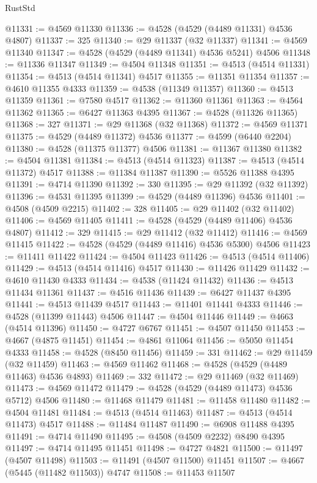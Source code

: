 \begin{lexlean}{RustStd}
\begin{coremodule}
@11331 := @4569 @11330
@11336 := @4528 (@4529 (@4489 @11331) @4536 @4807)
@11337 := 325
@11340 := @29 @11337 (@32 @11337)
@11341 := @4569 @11340
@11347 := @4528 (@4529 (@4489 @11341) @4536 @5241) @4506
@11348 := @11336 @11347
@11349 := @4504 @11348
@11351 := @4513 (@4514 @11331)
@11354 := @4513 (@4514 @11341) @4517
@11355 := @11351 @11354
@11357 := @4610 @11355 @4333
@11359 := @4538 (@11349 @11357)
@11360 := @4513 @11359
@11361 := @7580 @4517
@11362 := @11360 @11361
@11363 := @4564 @11362
@11365 := @6427 @11363 @4395
@11367 := @4528 (@11326 @11365)
@11368 := 327
@11371 := @29 @11368 (@32 @11368)
@11372 := @4569 @11371
@11375 := @4529 (@4489 @11372) @4536
@11377 := @4599 (@6440 @2204)
@11380 := @4528 (@11375 @11377) @4506
@11381 := @11367 @11380
@11382 := @4504 @11381
@11384 := @4513 (@4514 @11323)
@11387 := @4513 (@4514 @11372) @4517
@11388 := @11384 @11387
@11390 := @5526 @11388 @4395
@11391 := @4714 @11390
@11392 := 330
@11395 := @29 @11392 (@32 @11392)
@11396 := @4531 @11395
@11399 := @4529 (@4489 @11396) @4536
@11401 := @4508 (@4509 @2215)
@11402 := 328
@11405 := @29 @11402 (@32 @11402)
@11406 := @4569 @11405
@11411 := @4528 (@4529 (@4489 @11406) @4536 @4807)
@11412 := 329
@11415 := @29 @11412 (@32 @11412)
@11416 := @4569 @11415
@11422 := @4528 (@4529 (@4489 @11416) @4536 @5300) @4506
@11423 := @11411 @11422
@11424 := @4504 @11423
@11426 := @4513 (@4514 @11406)
@11429 := @4513 (@4514 @11416) @4517
@11430 := @11426 @11429
@11432 := @4610 @11430 @4333
@11434 := @4538 (@11424 @11432)
@11436 := @4513 @11434 @11361
@11437 := @4516 @11436
@11439 := @6427 @11437 @4395
@11441 := @4513 @11439 @4517
@11443 := @11401 @11441 @4333
@11446 := @4528 (@11399 @11443) @4506
@11447 := @4504 @11446
@11449 := @4663 (@4514 @11396)
@11450 := @4727 @6767
@11451 := @4507 @11450
@11453 := @4667 (@4875 @11451)
@11454 := @4861 @11064
@11456 := @5050 @11454 @4333
@11458 := @4528 (@8450 @11456)
@11459 := 331
@11462 := @29 @11459 (@32 @11459)
@11463 := @4569 @11462
@11468 := @4528 (@4529 (@4489 @11463) @4536 @4893)
@11469 := 332
@11472 := @29 @11469 (@32 @11469)
@11473 := @4569 @11472
@11479 := @4528 (@4529 (@4489 @11473) @4536 @5712) @4506
@11480 := @11468 @11479
@11481 := @11458 @11480
@11482 := @4504 @11481
@11484 := @4513 (@4514 @11463)
@11487 := @4513 (@4514 @11473) @4517
@11488 := @11484 @11487
@11490 := @6908 @11488 @4395
@11491 := @4714 @11490
@11495 := @4508 (@4509 @2232) @8490 @4395
@11497 := @4714 @11495 @11451
@11498 := @4727 @4821
@11500 := @11497 (@4507 @11498)
@11503 := @11491 (@4507 @11500) @11451
@11507 := @4667 (@5445 (@11482 @11503)) @4747
@11508 := @11453 @11507

\end{coremodule}
\end{lexlean}
